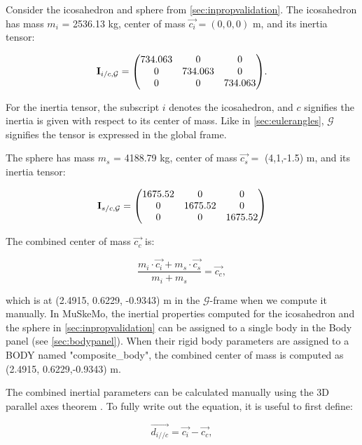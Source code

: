 \documentclass{article}
\begin{document}
Consider the icosahedron and sphere from \ref{sec:inpropvalidation}. The icosahedron has mass \(m_{i}\) = 2536.13 \si{kg}, center of mass \(\vec{c_{i}} =  (0,0,0)\)  \si{m}, and its inertia tensor:

\begin{equation}
    \mathbf{I}_{i/c,{\mathcal{G}}} = \mqty(
    734.063 & 0 & 0 \\
    0 & 734.063 & 0 \\
    0 & 0 & 734.063
    ).
\end{equation}

For the inertia tensor, the subscript \(i\) denotes the icosahedron, and \(c\) signifies the inertia is given with respect to its center of mass. Like in \ref{sec:eulerangles}, \(\mathcal{G}\) signifies the tensor is expressed in the global frame.

The sphere has mass \(m_{s}\) = 4188.79 \si{kg}, center of mass \(\vec{c_{s}} =\) (4,1,-1.5) \si{m}, and its inertia tensor:

\begin{equation}
    \mathbf{I}_{s/c,{\mathcal{G}}} = \mqty(
    1675.52 & 0 & 0 \\
    0 & 1675.52 & 0 \\
    0 & 0 & 1675.52
    )
\end{equation}

The combined center of mass \(\vec{c_{c}}\) is:

\begin{equation}
    \frac{m_{i} \cdot \vec{c_{i}} + m_{s} \cdot \vec{c_{s}}}{m_{i} + m_{s}} = \vec{c_{c}},
\end{equation}

which is at (2.4915, 0.6229, -0.9343) \si{m} in the \(\mathcal{G}\)-frame when we compute it manually. In MuSkeMo, the inertial properties computed for the icosahedron and the sphere in \ref{sec:inpropvalidation} can be assigned to a single body in the Body panel (see \ref{sec:bodypanel}). When their rigid body parameters are assigned to a BODY named "composite\_body", the combined center of mass is computed as (2.4915, 0.6229,-0.9343) \si{m}. 

The combined inertial parameters can be calculated manually using the 3D parallel axes theorem \cite{valleryAdvancedDynamics2019,ruinaMechanicsToolsetStatics2019}. To fully write out the equation, it is useful to first define:

\begin{equation}
\vec{d_{i//c}} = \vec{c_i} - \vec{c_c},
\end{equation}
\end{document}
